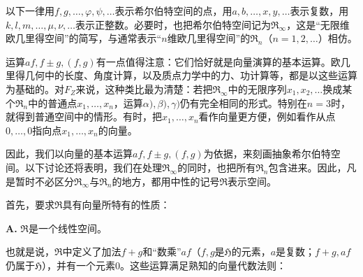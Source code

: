 \documentclass[fontsize=13pt,twoside,openany,headings=normal,parskip=false,bookmarkpackage=false,DIV=calc]{scrbook}
\begin{document}
以下一律用$f,\allowbreak g,\allowbreak \ldots,\allowbreak \varphi,\allowbreak \psi,\allowbreak \ldots$表示希尔伯特空间的点，用$a,\allowbreak b,\allowbreak \ldots,\allowbreak x,\allowbreak y,\allowbreak \ldots$表示复数，用$k,\allowbreak l,\allowbreak m,\allowbreak \ldots,\allowbreak \mu,\allowbreak \nu,\allowbreak \ldots$表示正整数。必要时，也把希尔伯特空间记为$\mathfrak{R}_\infty$，这是“无限维欧几里得空间”的简写，与通常表示“$n$维欧几里得空间”的$\mathfrak{R}_n$（$n=1,\allowbreak 2,\allowbreak \ldots$）相仿。

运算$af,\allowbreak f\pm g,\allowbreak (f,\allowbreak g)$有一点值得注意：它们恰好就是向量演算的基本运算。欧几里得几何中的长度、角度计算，以及质点力学中的力、功计算等，都是以这些运算为基础的。对$F_Z$来说，这种类比最为清楚：若把$\mathfrak{R}_\infty$中的无限序列$x_1,\allowbreak x_2,\allowbreak \ldots$换成某个$\mathfrak{R}_n$中的普通点$x_1,\allowbreak \ldots,\allowbreak x_n$，运算$\alpha),\allowbreak \beta),\allowbreak \gamma)$仍有完全相同的形式。特别在$n=3$时，就得到普通空间中的情形。有时，把$x_1,\allowbreak \ldots,\allowbreak x_n$看作向量更方便，例如看作从点$0,\allowbreak \ldots,\allowbreak 0$指向点$x_1,\allowbreak \ldots,\allowbreak x_n$的向量。

因此，我们以向量的基本运算$af,\allowbreak f\pm g,\allowbreak (f,\allowbreak g)$为依据，来刻画抽象希尔伯特空间。以下讨论还将表明，我们在处理$\mathfrak{R}_\infty$的同时，也把所有$\mathfrak{R}_n$包含进来。因此，凡是暂时不必区分$\mathfrak{R}_\infty$与$\mathfrak{R}_n$的地方，都用中性的记号$\mathfrak{R}$表示空间。

首先，要求$\mathfrak{R}$具有向量所特有的性质：

\leavevmode{}\textbf{A.}\label{ax:II.A} $\mathfrak{R}$是一个线性空间。

也就是说，$\mathfrak{R}$中定义了加法$f+g$和“数乘”$af$（$f,\allowbreak g$是$\mathfrak{H}$的元素，$a$是复数；$f+g,\allowbreak af$仍属于$\mathfrak{H}$），并有一个元素$0$。这些运算满足熟知的向量代数法则：
\end{document}

